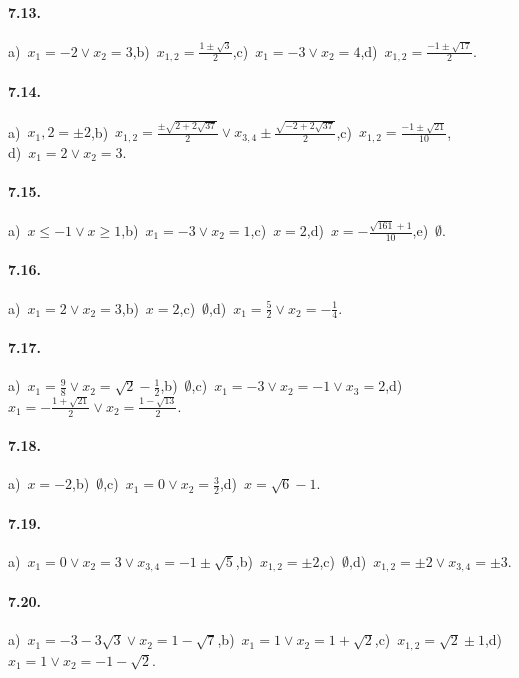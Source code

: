 \paragraph{7.13.} a)~$x_1=-2\vee x_2=3$,\quad b)~$x_{1,2}=\frac{1\pm \sqrt 3} 2$,\quad c)~$x_1=-3\vee x_2=4$,\quad d)~$x_{1,2}=\frac{-1\pm \sqrt{17}} 2$.

\paragraph{7.14.} a)~$x_1,2=\pm 2$,\quad b)~$x_{1,2}=\frac{\pm \sqrt{2+2\sqrt{37}}} 2\vee x_{3,4}\pm \frac{\sqrt{-2+2\sqrt{37}}} 2$,\quad c)~$x_{1,2}=\frac{-1\pm \sqrt{21}}{10}$,\protect\\
\quad d)~$x_1=2\vee x_2=3$.

\paragraph{7.15.} a)~$x\le -1\vee x\ge 1$,\quad b)~$x_1=-3\vee x_2=1$,\quad c)~$x=2$,\quad d)~$x=-\frac{\sqrt{161}+1}{10}$,\quad e)~$\emptyset $.

\paragraph{7.16.} a)~$x_1=2\vee x_2=3$,\quad b)~$x=2$,\quad c)~$\emptyset $,\quad d)~$x_1=\frac 5 2\vee x_2=-\frac 1 4$.

\paragraph{7.17.} a)~$x_1=\frac 9 8\vee x_2=\sqrt 2-\frac 1 2$,\quad b)~$\emptyset $,\quad c)~$x_1=-3\vee x_2=-1\vee x_3=2$,\quad d)~$x_1=-\frac{1+\sqrt{21}} 2\vee x_2=\frac{1-\sqrt{13}} 2$.

\paragraph{7.18.} a)~$x=-2$,\quad b)~$\emptyset $,\quad c)~$x_1=0\vee x_2=\frac 3 2$,\quad d)~$x=\sqrt 6-1$.

\paragraph{7.19.} a)~$x_1=0\vee x_2=3 \vee x_{3,4}=-1\pm \sqrt 5$,\quad b)~$x_{1,2}=\pm 2$,\quad c)~$\emptyset $,\quad d)~$x_{1,2}=\pm 2\vee x_{3,4}=\pm 3$.

\paragraph{7.20.} a)~$x_1=-3-3\sqrt 3\vee x_2=1-\sqrt 7$,\quad b)~$x_1=1\vee x_2=1+\sqrt 2$,\quad c)~$x_{1,2}=\sqrt 2\pm 1$,\quad d)~$x_1=1\vee x_2=-1-\sqrt 2$.

